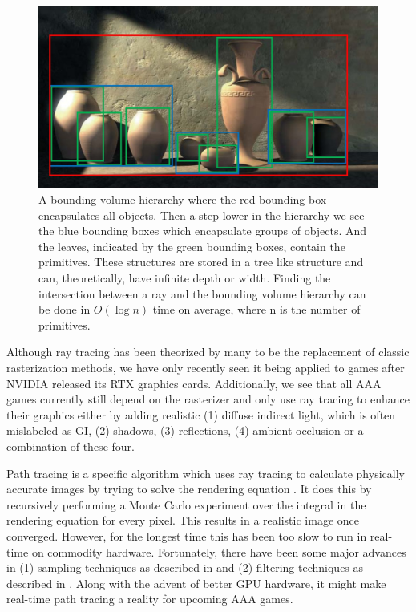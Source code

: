 \begin{figure}[H]
    \centering
    \includegraphics[width=0.9\linewidth]{figures/bvh.jpg}
    \caption{A bounding volume hierarchy where the red bounding box encapsulates all objects. Then a step lower in the hierarchy we see the blue bounding boxes which encapsulate groups of objects. And the leaves, indicated by the green bounding boxes, contain the primitives. These structures are stored in a tree like structure and can, theoretically, have infinite depth or width. Finding the intersection between a ray and the bounding volume hierarchy can be done in $O(\log n)$ time on average, where n is the number of primitives. \cite{BVHJacco}}
    \label{fig:bvh}
\end{figure}

Although ray tracing has been theorized by many to be the replacement of classic rasterization methods, we have only recently seen it being applied to games after NVIDIA released its RTX graphics cards. Additionally, we see that all AAA games currently still depend on the rasterizer and only use ray tracing to enhance their graphics either by adding realistic (1) diffuse indirect light, which is often mislabeled as GI, (2) shadows, (3) reflections, (4) ambient occlusion or a combination of these four\cite{NVIDIARTX}. 

Path tracing is a specific algorithm which uses ray tracing to calculate physically accurate images by trying to solve the rendering equation \cite{kajiya1986rendering}. It does this by recursively performing a Monte Carlo experiment over the integral in the rendering equation for every pixel. This results in a realistic image once converged. However, for the longest time this has been too slow to run in real-time on commodity hardware. Fortunately, there have been some major advances in (1) sampling techniques as described in \cite{lin2022generalized} and (2) filtering techniques as described in \cite{yang2020survey}. Along with the advent of better GPU hardware, it might make real-time path tracing a reality for upcoming AAA games. 

